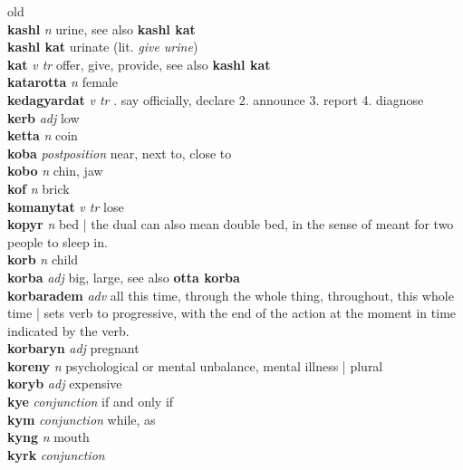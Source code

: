 \textperiodcentered old\\\textbf{kashl}   \emph{n} \textperiodcentered urine, see also \textbf{kashl kat}\\\textbf{kashl kat}    \textperiodcentered urinate (lit. \emph{give urine})\\\textbf{kat}   \emph{v tr} \textperiodcentered offer, give, provide, see also \textbf{kashl kat}\\\textbf{katarotta}   \emph{n} \textperiodcentered female\\\textbf{kedagyardat}   \emph{v tr} . say officially, declare 2. announce 3. report 4. diagnose \\\textbf{kerb}   \emph{adj} \textperiodcentered low\\\textbf{ketta}   \emph{n} \textperiodcentered coin\\\textbf{koba}   \emph{postposition} \textperiodcentered near, next to, close to\\\textbf{kobo}   \emph{n} \textperiodcentered chin, jaw\\\textbf{kof}   \emph{n} \textperiodcentered brick\\\textbf{komanytat}   \emph{v tr} \textperiodcentered lose\\\textbf{kopyr}   \emph{n} \textperiodcentered bed | the dual can also mean double bed, in the sense of meant for two people to sleep in.\\\textbf{korb}   \emph{n} \textperiodcentered child\\\textbf{korba}   \emph{adj} \textperiodcentered big, large, see also \textbf{otta korba}\\\textbf{korbaradem}   \emph{adv} \textperiodcentered all this time, through the whole thing, throughout, this whole time | sets verb to progressive, with the end of the action at the moment in time indicated by the verb.\\\textbf{korbaryn}   \emph{adj} \textperiodcentered pregnant\\\textbf{koreny}   \emph{n} \textperiodcentered psychological or mental unbalance, mental illness | plural\\\textbf{koryb}   \emph{adj} \textperiodcentered expensive\\\textbf{kye}   \emph{conjunction} \textperiodcentered if and only if\\\textbf{kym}   \emph{conjunction} \textperiodcentered while, as\\\textbf{kyng}   \emph{n} \textperiodcentered mouth\\\textbf{kyrk}   \emph{conjunction} \textperiodcentered 
